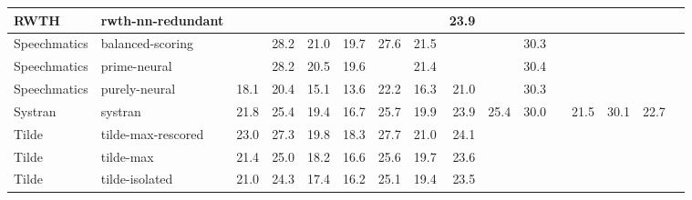 \begin{table*}
\begin{center}
\begin{tabular}{|l|l|rrrrrrr|rrrrrrr|}
RWTH & rwth-nn-redundant & \cellcolor{green}{24.6} & \cellcolor{green}{29.6} & \cellcolor{lightgreen}{21.8} & \cellcolor{green}{21.4} & \cellcolor{lightyellow}{28.1} & \cellcolor{lightgreen}{22.6} & 23.9 & \cellcolor{lightgreen}{26.2} & \cellcolor{lightyellow}{30.8} & \cellcolor{lightgreen}{23.1} & \cellcolor{lightgreen}{22.1} & \cellcolor{lightyellow}{30.9} & \cellcolor{lightgreen}{23.6} & \cellcolor{lightgreen}{26.8} \\ \hline
Speechmatics & balanced-scoring & \cellcolor{lightyellow}{23.8} & 28.2 & 21.0 & 19.7 & 27.6 & 21.5 & \cellcolor{lightyellow}{24.7} & \cellcolor{lightyellow}{25.8} & 30.3 & \cellcolor{lightyellow}{22.6} & \cellcolor{lightyellow}{22.0} & \cellcolor{lightyellow}{30.5} & \cellcolor{lightyellow}{23.3} & \cellcolor{lightyellow}{26.3} \\ \hline
Speechmatics & prime-neural & \cellcolor{lightyellow}{23.9} & 28.2 & 20.5 & 19.6 & \cellcolor{lightgreen}{28.3} & 21.4 & \cellcolor{lightgreen}{25.3} & \cellcolor{lightyellow}{25.9} & 30.4 & \cellcolor{lightyellow}{22.5} & \cellcolor{lightyellow}{21.9} & \cellcolor{lightyellow}{30.7} & \cellcolor{lightyellow}{23.3} & \cellcolor{lightyellow}{26.4} \\ \hline
Speechmatics & purely-neural & 18.1 & 20.4 & 15.1 & 13.6 & 22.2 & 16.3 & 21.0 & \cellcolor{lightyellow}{25.8} & 30.3 & \cellcolor{lightyellow}{22.5} & \cellcolor{lightyellow}{21.9} & \cellcolor{lightyellow}{30.6} & \cellcolor{lightyellow}{23.2} & \cellcolor{lightyellow}{26.2} \\ \hline
Systran & systran & 21.8 & 25.4 & 19.4 & 16.7 & 25.7 & 19.9 & 23.9 & 25.4 & 30.0 & \cellcolor{lightyellow}{22.3} & 21.5 & 30.1 & 22.7 & \cellcolor{lightyellow}{26.1} \\ \hline
Tilde & tilde-max-rescored & 23.0 & 27.3 & 19.8 & 18.3 & 27.7 & 21.0 & 24.1 & \cellcolor{lightyellow}{26.0} & \cellcolor{lightyellow}{30.6} & \cellcolor{lightgreen}{22.8} & \cellcolor{lightyellow}{21.9} & \cellcolor{lightyellow}{30.9} & \cellcolor{lightyellow}{23.4} & \cellcolor{lightyellow}{26.2} \\ \hline
Tilde & tilde-max & 21.4 & 25.0 & 18.2 & 16.6 & 25.6 & 19.7 & 23.6 & \cellcolor{lightgreen}{26.2} & \cellcolor{lightyellow}{30.8} & \cellcolor{lightgreen}{22.8} & \cellcolor{lightgreen}{22.1} & \cellcolor{lightgreen}{31.1} & \cellcolor{lightgreen}{23.6} & \cellcolor{lightgreen}{26.6} \\ \hline
Tilde & tilde-isolated & 21.0 & 24.3 & 17.4 & 16.2 & 25.1 & 19.4 & 23.5 & \cellcolor{lightyellow}{25.9} & \cellcolor{lightyellow}{30.6} & \cellcolor{lightyellow}{22.5} & \cellcolor{lightyellow}{22.0} & \cellcolor{lightyellow}{30.8} & \cellcolor{lightyellow}{23.2} & \cellcolor{lightgreen}{26.5} \\ \hline

\end{tabular}
\end{center}
\end{table*}
